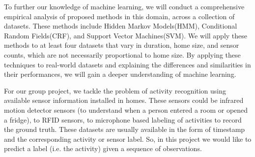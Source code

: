 \documentclass[11pt, oneside]{article}   	%
\begin{document}
To further our knowledge of machine learning, we will conduct a comprehensive empirical analysis of proposed methods in this domain, across a collection of datasets. These methods include Hidden Markov Models(HMM), Conditional Random Fields(CRF), and Support Vector Machines(SVM). We will apply these methods to at least four datasets that vary in duration, home size, and sensor counts, which are not necessarily proportional to home size. By applying these techniques to real-world datasets and explaining the differences and similarities in their performances, we will gain a deeper understanding of machine learning.

For our group project, we tackle the problem of activity recognition using available sensor information installed in homes. These sensors could be infrared motion detector sensors (to understand when a person entered a room or opened a fridge), to RFID sensors, to microphone based labeling of activities to record the ground truth. These datasets are usually available in the form of timestamp and the corresponding activity or sensor label. So, in this project we would like to predict a label (i.e. the activity) given a sequence of observations. 
\end{document}
